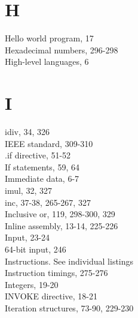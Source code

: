 \documentclass[10pt]{article}
\begin{document}
\section*{H}
Hello world program, 17\\
Hexadecimal numbers, 296-298\\
High-level languages, 6

\section*{I}
idiv, 34, 326\\
IEEE standard, 309-310\\
.if directive, 51-52\\
If statements, 59, 64\\
Immediate data, 6-7\\
imul, 32, 327\\
inc, 37-38, 265-267, 327\\
Inclusive or, 119, 298-300, 329\\
Inline assembly, 13-14, 225-226\\
Input, 23-24\\
64-bit input, 246\\
Instructions. See individual listings\\
Instruction timings, 275-276\\
Integers, 19-20\\
INVOKE directive, 18-21\\
Iteration structures, 73-90, 229-230
\end{document}
